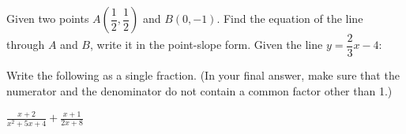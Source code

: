 \documentclass[addpoints,12pt]{exam}
\begin{document}
\begin{questions}
\begin{center}
\end{center}

\question[5] Given two points $A\left(\dfrac{1}{2},\dfrac{1}{2}\right)$ and $B(0,-1)$.
    Find the equation of the line through $A$ and $B$, write it in the point-slope form.
\vfill
\newpage
\question Given the line $y=\dfrac{2}{3}x-4$:


\question[6] Write the following as a single fraction. (In your final answer, make sure that the numerator and the denominator do not contain a common factor other than 1.)
     \vspace{.5cm}
     
        $\displaystyle{\frac{x+2}{x^2+5x+4} + \frac{x+1}{2x+8}}$
        \vfill\vfill\vfill\vfill


\end{questions}
\end{document}
